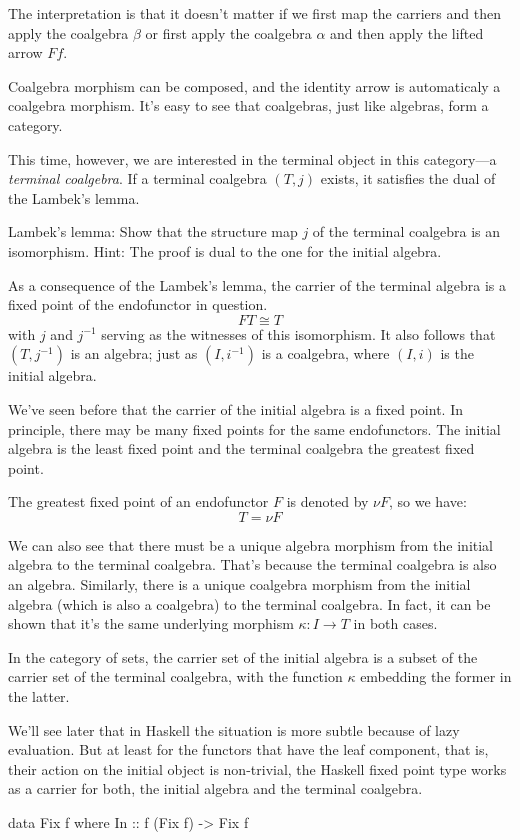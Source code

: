 \documentclass[DaoFP]{subfiles}
\begin{document}
The interpretation is that it doesn't matter if we first map the carriers and then apply the coalgebra $\beta$ or first apply the coalgebra $\alpha$ and then apply the lifted arrow $F f$.

Coalgebra morphism can be composed, and the identity arrow is automaticaly a coalgebra morphism. It's easy to see that coalgebras, just like algebras, form a category. 

This time, however, we are interested in the terminal object in this category---a \emph{terminal coalgebra}. If a terminal coalgebra $(T, j)$ exists, it satisfies the dual of the Lambek's lemma. 

\begin{exercise}{Lambek's lemma:}
Show that the structure map $j$ of the terminal coalgebra is an isomorphism. Hint: The proof is dual to the one for the initial algebra.
\end{exercise}

As a consequence of the Lambek's lemma, the carrier of the terminal algebra is a fixed point of the endofunctor in question. 
\[ F T \cong T \]
with $j$ and $j^{-1}$ serving as the witnesses of this isomorphism. It also follows that $(T, j^{-1})$ is an algebra; just as  $(I, i^{-1})$ is a coalgebra, where $(I, i)$ is the initial algebra.

We've seen before that the carrier of the initial algebra is a fixed point. In principle, there may be many fixed points for the same endofunctors. The initial algebra is the least fixed point and the terminal coalgebra the greatest fixed point. 

The greatest fixed point of an endofunctor $F$ is denoted by $\nu F$, so we have:
\[ T = \nu F \]

We can also see that there must be a unique algebra morphism from the initial algebra to the terminal coalgebra. That's because the terminal coalgebra is also an algebra. Similarly, there is a unique coalgebra morphism from the initial algebra (which is also a coalgebra) to the terminal coalgebra. In fact, it can be shown that it's the same underlying morphism $\kappa \colon I \to T$ in both cases. 

In the category of sets, the carrier set of the initial algebra is a subset of the carrier set of the terminal coalgebra, with the function $\kappa$ embedding the former in the latter. 

We'll see later that in Haskell the situation is more subtle because of lazy evaluation. But at least for the functors that have the leaf component, that is, their action on the initial object is non-trivial, the Haskell fixed point type works as a carrier for both, the initial algebra and the terminal coalgebra.
\begin{haskell}
data Fix f where
  In :: f (Fix f) -> Fix f
\end{haskell}
\end{document}
